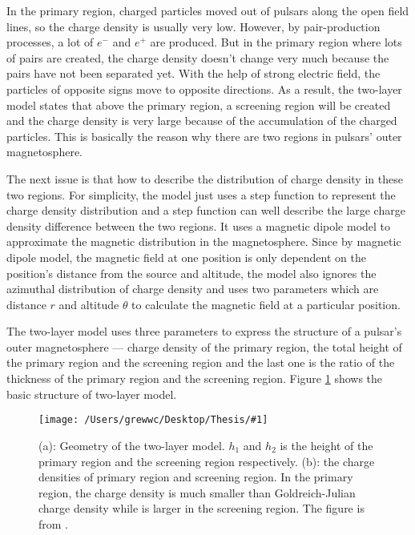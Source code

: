 \documentclass[12pt]{report}
\newcommand{\singleFig}[3]{
  \begin{figure}[!htp]
    \centering
    \texttt{[image: /Users/grewwc/Desktop/Thesis/\#1]}
    \caption{#3}
    \label{fig: #1}
  \end{figure}
}
\begin{document}
        In the primary region, charged particles moved out of pulsars along the open field 
        lines, so the charge density is usually very low. 
        However, by pair-production processes, a lot of $e^{-}$ and $e^{+}$ are produced. 
        But in the primary region where lots of pairs are created, the charge density 
        doesn't change very much because the pairs have not been separated yet. With the help 
        of strong electric field, the particles of opposite signs move to opposite directions. 
        As a result, the two-layer model states that above the primary region, a screening 
        region will be created and the charge density is very large because of the accumulation 
        of the charged particles. This is basically the reason why there are two regions in 
        pulsars' outer magnetosphere.

        The next issue is that how to describe the distribution of charge density in these two 
        regions. For simplicity, the model just uses a step function to represent the charge 
        density distribution and a step function can well describe the large charge density 
        difference between the two regions. It uses a magnetic dipole model to approximate the 
        magnetic distribution in the magnetosphere. Since by magnetic dipole model, the magnetic 
        field at one position is only dependent on the position's distance from the source 
        and altitude, the model also ignores the azimuthal distribution of charge density 
        and uses two parameters which are distance $r$ and altitude $\theta$ to calculate the 
        magnetic field at a particular position.

        The two-layer model uses three parameters to express the structure of a pulsar's outer 
        magnetosphere --- charge density of the primary region, the total height of the primary 
        region and the screening region and the last one is the ratio of the thickness of the 
        primary region and the screening region. Figure \ref{fig: charge_density} shows the 
        basic structure of two-layer model. 

        \singleFig{charge_density}{0.6}{(a): Geometry of the two-layer model. $h_{1}$ and 
          $h_{2}$ is the height of the primary region and the screening region respectively. 
          (b): the charge densities of primary region and screening region. In the primary 
          region, the charge density is much smaller than Goldreich-Julian charge density
          while is larger in the screening region. The figure is from 
          \cite{0004-637X-720-1-178}.}
\end{document}
